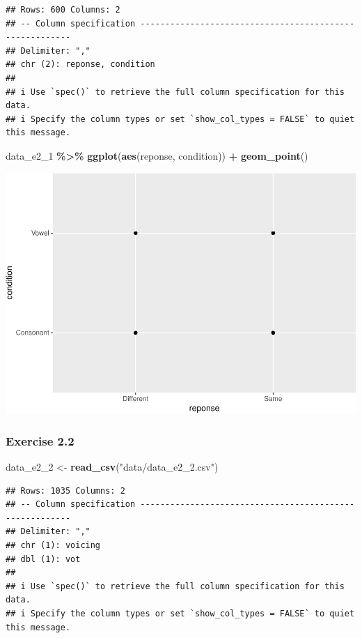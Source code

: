 \documentclass[
]{article}
\newenvironment{Shaded}{\begin{snugshade}}{\end{snugshade}}
\newcommand{\FunctionTok}[1]{\textcolor[rgb]{0.13,0.29,0.53}{\textbf{#1}}}
\newcommand{\NormalTok}[1]{#1}
\newcommand{\OtherTok}[1]{\textcolor[rgb]{0.56,0.35,0.01}{#1}}
\newcommand{\SpecialCharTok}[1]{\textcolor[rgb]{0.81,0.36,0.00}{\textbf{#1}}}
\newcommand{\StringTok}[1]{\textcolor[rgb]{0.31,0.60,0.02}{#1}}
\begin{document}
\begin{verbatim}
## Rows: 600 Columns: 2
## -- Column specification --------------------------------------------------------
## Delimiter: ","
## chr (2): reponse, condition
## 
## i Use `spec()` to retrieve the full column specification for this data.
## i Specify the column types or set `show_col_types = FALSE` to quiet this message.
\end{verbatim}

\begin{Shaded}
\begin{Highlighting}[]
\NormalTok{data\_e2\_1 }\SpecialCharTok{\%\textgreater{}\%}
  \FunctionTok{ggplot}\NormalTok{(}\FunctionTok{aes}\NormalTok{(reponse, condition)) }\SpecialCharTok{+}
  \FunctionTok{geom\_point}\NormalTok{()}
\end{Highlighting}
\end{Shaded}

\includegraphics{analysis_files/figure-latex/e2-1-1.pdf}

\hypertarget{exercise-2.2}{%
\subsubsection{Exercise 2.2}\label{exercise-2.2}}

\begin{Shaded}
\begin{Highlighting}[]
\NormalTok{data\_e2\_2 }\OtherTok{\textless{}{-}} \FunctionTok{read\_csv}\NormalTok{(}\StringTok{"data/data\_e2\_2.csv"}\NormalTok{)}
\end{Highlighting}
\end{Shaded}

\begin{verbatim}
## Rows: 1035 Columns: 2
## -- Column specification --------------------------------------------------------
## Delimiter: ","
## chr (1): voicing
## dbl (1): vot
## 
## i Use `spec()` to retrieve the full column specification for this data.
## i Specify the column types or set `show_col_types = FALSE` to quiet this message.
\end{verbatim}
\end{document}
